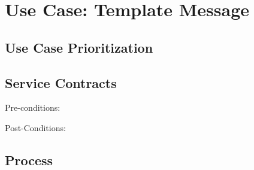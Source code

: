 \documentclass[a4paper,12pt]{article}
\begin{document}
\section{Use Case: Template Message}
    
\subsection{Use Case Prioritization}
      
\subsection{Service Contracts}
Pre-conditions: 
\begin{itemize}
\end{itemize}
      
Post-Conditions:
\begin{itemize}
\end{itemize}
      
\subsection{Process}
\end{document}
